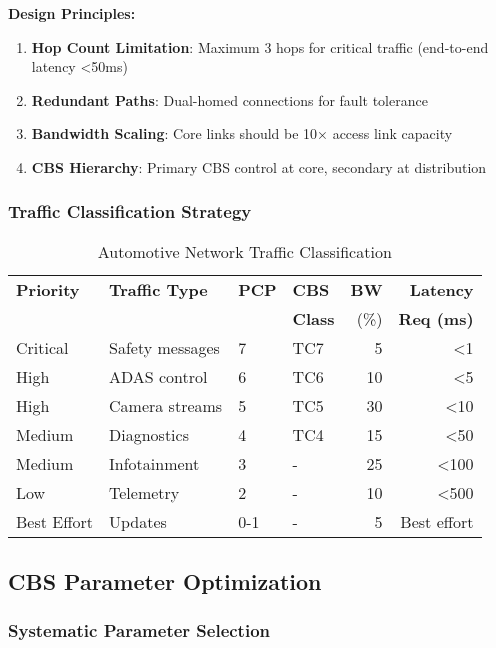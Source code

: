 \documentclass[10pt, journal, compsoc]{IEEEtran}
\begin{document}
\textbf{Design Principles:}
\begin{enumerate}
    \item \textbf{Hop Count Limitation}: Maximum 3 hops for critical traffic (end-to-end latency <50ms)
    \item \textbf{Redundant Paths}: Dual-homed connections for fault tolerance
    \item \textbf{Bandwidth Scaling}: Core links should be 10× access link capacity
    \item \textbf{CBS Hierarchy}: Primary CBS control at core, secondary at distribution
\end{enumerate}

\subsubsection{Traffic Classification Strategy}

\begin{table}[h]
\centering
\caption{Automotive Network Traffic Classification}
\label{tab:traffic_classification}
\begin{tabular}{llllrr}
\toprule
\textbf{Priority} & \textbf{Traffic Type} & \textbf{PCP} & \textbf{CBS} & \textbf{BW} & \textbf{Latency} \\
 & & & \textbf{Class} & (\%) & \textbf{Req (ms)} \\
\midrule
Critical & Safety messages & 7 & TC7 & 5 & <1 \\
High & ADAS control & 6 & TC6 & 10 & <5 \\
High & Camera streams & 5 & TC5 & 30 & <10 \\
Medium & Diagnostics & 4 & TC4 & 15 & <50 \\
Medium & Infotainment & 3 & - & 25 & <100 \\
Low & Telemetry & 2 & - & 10 & <500 \\
Best Effort & Updates & 0-1 & - & 5 & Best effort \\
\bottomrule
\end{tabular}
\end{table}

\subsection{CBS Parameter Optimization}

\subsubsection{Systematic Parameter Selection}
\end{document}
